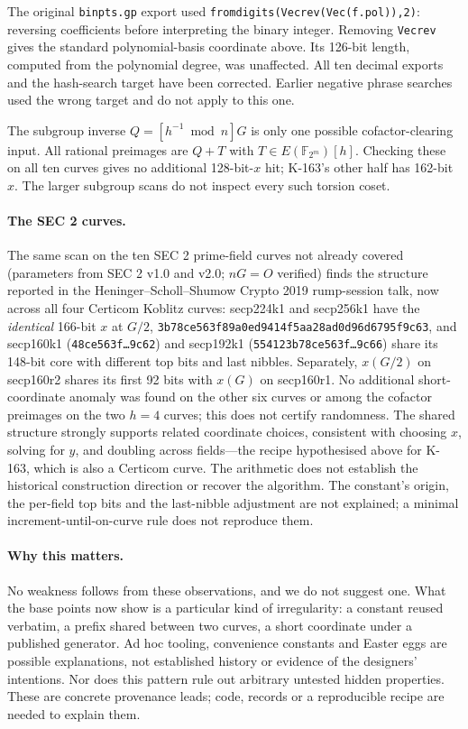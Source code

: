 \documentclass[11pt]{article}
\newcommand{\F}{\mathbb{F}}
\begin{document}
The original \texttt{binpts.gp} export used \texttt{fromdigits(Vecrev(Vec(f.pol)),2)}: reversing coefficients before interpreting the binary integer. Removing \texttt{Vecrev} gives the standard polynomial-basis coordinate above. Its 126-bit length, computed from the polynomial degree, was unaffected. All ten decimal exports and the hash-search target have been corrected. Earlier negative phrase searches used the wrong target and do not apply to this one.

The subgroup inverse $Q=[h^{-1}\bmod n]G$ is only one possible cofactor-clearing input. All rational preimages are $Q+T$ with $T\in E(\F_{2^m})[h]$. Checking these on all ten curves gives no additional 128-bit-$x$ hit; K-163's other half has 162-bit $x$. The larger subgroup scans do not inspect every such torsion coset.

\paragraph{The SEC 2 curves.} The same scan on the ten SEC 2 prime-field curves not already covered (parameters from SEC 2 v1.0 and v2.0; $nG=O$ verified) finds the structure reported in the Heninger--Scholl--Shumow Crypto 2019 rump-session talk, now across all four Certicom Koblitz curves: secp224k1 and secp256k1 have the \emph{identical} 166-bit $x$ at $G/2$, \texttt{3b78ce563f89a0ed9414f5aa28ad0d96d6795f9c63}, and secp160k1 (\texttt{48ce563f\ldots9c62}) and secp192k1 (\texttt{554123b78ce563f\ldots9c66}) share its 148-bit core with different top bits and last nibbles. Separately, $x(G/2)$ on secp160r2 shares its first 92 bits with $x(G)$ on secp160r1. No additional short-coordinate anomaly was found on the other six curves or among the cofactor preimages on the two $h=4$ curves; this does not certify randomness. The shared structure strongly supports related coordinate choices, consistent with choosing $x$, solving for $y$, and doubling across fields---the recipe hypothesised above for K-163, which is also a Certicom curve. The arithmetic does not establish the historical construction direction or recover the algorithm. The constant's origin, the per-field top bits and the last-nibble adjustment are not explained; a minimal increment-until-on-curve rule does not reproduce them.

\paragraph{Why this matters.} No weakness follows from these observations, and we do not suggest one. What the base points now show is a particular kind of irregularity: a constant reused verbatim, a prefix shared between two curves, a short coordinate under a published generator. Ad hoc tooling, convenience constants and Easter eggs are possible explanations, not established history or evidence of the designers' intentions. Nor does this pattern rule out arbitrary untested hidden properties. These are concrete provenance leads; code, records or a reproducible recipe are needed to explain them.
\end{document}
